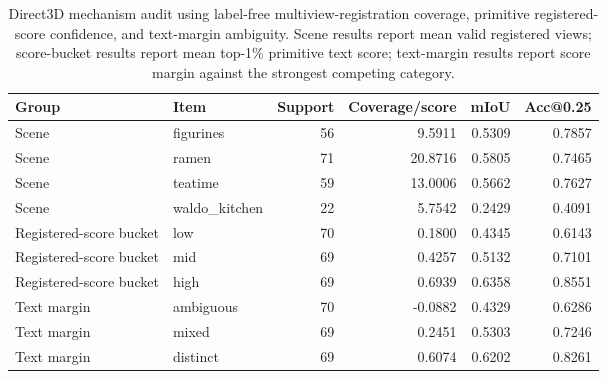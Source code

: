 \begin{table}[t]
\centering
\caption{Direct3D mechanism audit using label-free multiview-registration coverage, primitive registered-score confidence, and text-margin ambiguity. Scene results report mean valid registered views; score-bucket results report mean top-1\% primitive text score; text-margin results report score margin against the strongest competing category.}
\label{tab:direct3d_confidence_coverage}
\begin{tabular}{llrrrr}
\toprule
Group & Item & Support & Coverage/score & mIoU & Acc@0.25 \\
\midrule
Scene & figurines & 56 & 9.5911 & 0.5309 & 0.7857 \\
Scene & ramen & 71 & 20.8716 & 0.5805 & 0.7465 \\
Scene & teatime & 59 & 13.0006 & 0.5662 & 0.7627 \\
Scene & waldo\_kitchen & 22 & 5.7542 & 0.2429 & 0.4091 \\
\midrule
Registered-score bucket & low & 70 & 0.1800 & 0.4345 & 0.6143 \\
Registered-score bucket & mid & 69 & 0.4257 & 0.5132 & 0.7101 \\
Registered-score bucket & high & 69 & 0.6939 & 0.6358 & 0.8551 \\
Text margin & ambiguous & 70 & -0.0882 & 0.4329 & 0.6286 \\
Text margin & mixed & 69 & 0.2451 & 0.5303 & 0.7246 \\
Text margin & distinct & 69 & 0.6074 & 0.6202 & 0.8261 \\
\bottomrule
\end{tabular}
\end{table}

